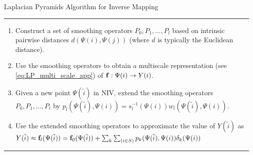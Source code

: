 \begin{table}[tb]
\caption{Laplacian Pyramids Algorithm for Inverse Mapping}
\hrule
\begin{enumerate}

\item
Construct a set of smoothing operators $P_0, P_1, \ldots, P_l$  based on intrinsic pairwise distances $d(\Psi(i),\Psi(j))$ (where $d$ is typically the Euclidean distance).

\item
Use the smoothing operators to obtain a multiscale representation (see \eqref{eq:LP_multi_scale_app}) of $\mathbf{f}:\Psi(i) \rightarrow Y(i)$.

\item Given a new point $\Psi(\tilde{i})$ in NIV, extend the smoothing operators $P_0, P_1, \ldots, P_l$  by
$p_l(\Psi(\tilde{i}), \Psi(i)) = s_l^{-1}(\Psi(i)) w_l(\Psi(\tilde{i}),\Psi(i))$.

\item
Use the extended smoothing operators to approximate the value of $Y(\tilde{i})$ as $Y(\tilde{i}) \approx \mathbf{f}_l(\Psi(\tilde{i})) = \mathbf{f}_0(\Psi(\tilde{i})) + \sum_{k}\sum_{(i \in S)}p_k(\Psi(\tilde{i}), \Psi(i))\delta_k(\Psi(i))$

\end{enumerate}
\hrule
\label{algo_LP}
\end{table}


